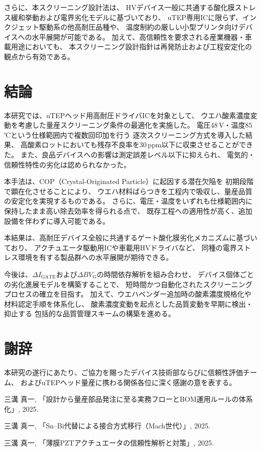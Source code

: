 \documentclass[twocolumn]{ieeetran}
\begin{document}
さらに、本スクリーニング設計法は、
HVデバイス一般に共通する酸化膜ストレス緩和挙動および電界劣化モデルに基づいており、
uTEP専用ICに限らず、インクジェット駆動系の他高耐圧品種や、
温度制約の厳しい小型プリンタ向けデバイスへの水平展開が可能である。
加えて、高信頼性を要求される産業機器・車載用途においても、
本スクリーニング設計指針は再発防止および工程安定化の観点から有効である。

\section{結論}

本研究では、uTEPヘッド用高耐圧ドライバICを対象として、
ウエハ酸素濃度変動を考慮した量産スクリーニング条件の最適化を実施した。
電圧48\,V・温度85\,℃という仕様範囲内で複数回印加を行う
逐次スクリーニング方式を導入した結果、
高酸素ロットにおいても残存不良率を30\,ppm以下に収束させることができた。
また、良品デバイスへの影響は測定誤差レベル以下に抑えられ、
電気的・信頼性特性の劣化は認められなかった。

本手法は、COP（Crystal-Originated Particle）に起因する潜在欠陥を
初期段階で顕在化させることにより、
ウエハ材料ばらつきを工程内で吸収し、量産品質の安定化を実現するものである。
さらに、電圧・温度をいずれも仕様範囲内に保持したまま高い除去効率を得られる点で、
既存工程への適用性が高く、追加設備を伴わずに導入可能である。

本結果は、高耐圧デバイス全般に共通するゲート酸化膜劣化メカニズムに基づいており、
アクチュエータ駆動用ICや車載用HVドライバなど、
同種の電界ストレス環境を有する製品群への水平展開が期待できる。

今後は、$\Delta I_\mathrm{GATE}$および$\Delta BV_\mathrm{G}$の時間依存解析を組み合わせ、
デバイス個体ごとの劣化進展モデルを構築することで、
短時間かつ自動化されたスクリーニングプロセスの確立を目指す。
加えて、ウエハベンダー追加時の酸素濃度規格化や材料認定手順を体系化し、
酸素濃度変動を起点とした品質変動を早期に検出・抑止する
包括的な品質管理スキームの構築を進める。

\section*{謝辞}
本研究の遂行にあたり、ご協力を賜ったデバイス技術部ならびに信頼性評価チーム、
およびuTEPヘッド量産に携わる関係各位に深く感謝の意を表する。

\begin{thebibliography}{99}

三溝 真一, 「設計から量産部品発注に至る実務フローとBOM運用ルールの体系化」, 2025.

三溝 真一, 「Sn–Bi代替による接合方式移行（Mach世代）」, 2025.

三溝 真一, 「薄膜PZTアクチュエータの信頼性解析と対策」, 2025.

\end{thebibliography}
\end{document}
